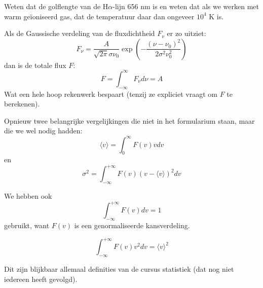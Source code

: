 \documentclass[a4paper,twoside]{article}
\theoremstyle{definition}
\theoremstyle{plain}
\begin{document}
Weten dat de golflengte van de H\(\alpha\)-lijn 656 nm is en weten dat als we werken met warm geïoniseerd gas, dat de temperatuur daar dan ongeveer \(10^4\) K is.

Als de Gaussische verdeling van de fluxdichtheid \(F_\nu\) er zo uitziet:
\[
F_\nu = \frac{A}{\sqrt{2 \pi} \sigma \nu_0} \exp \left( -\frac{(\nu - \nu_0)^2}{2 \sigma^2 \nu_0^2} \right)
\]
dan is de totale flux \(F\):
\[
F = \int_{-\infty}^{\infty} F_\nu d\nu = A
\]
Wat een hele hoop rekenwerk bespaart (tenzij ze expliciet vraagt om \(F\) te berekenen).

Opnieuw twee belangrijke vergelijkingen die niet in het formularium staan, maar die we wel nodig hadden:
\[
\langle v \rangle = \int_0^\infty  F (v) v dv
\]
en 
\[
\sigma^2 = \int_{-\infty}^{+\infty} F(v) (v - \langle v \rangle)^2 dv
\]

We hebben ook 
\[
\int_{-\infty}^{+\infty} F(v) dv = 1
\]
gebruikt, want \(F(v)\) is een genormaliseerde kansverdeling.

\[
\int_{-\infty}^{+\infty} F(v) v^2 dv = \langle v \rangle^2
\]

Dit zijn blijkbaar allemaal definities van de cursus statistiek (dat nog niet iedereen heeft gevolgd).
\end{document}
